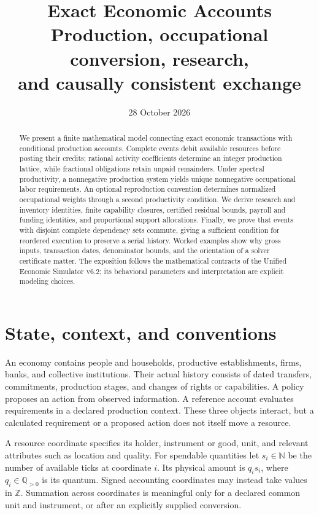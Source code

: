\documentclass[11pt,a4paper]{article}
\title{Exact Economic Accounts\\[4pt]\large Production, occupational conversion, research,\\and causally consistent exchange}
\author{}
\date{28 October 2026}
\begin{document}
\maketitle
\begin{abstract}
We present a finite mathematical model connecting exact economic transactions with conditional production accounts. Complete events debit available resources before posting their credits; rational activity coefficients determine an integer production lattice, while fractional obligations retain unpaid remainders. Under spectral productivity, a nonnegative production system yields unique nonnegative occupational labor requirements. An optional reproduction convention determines normalized occupational weights through a second productivity condition. We derive research and inventory identities, finite capability closures, certified residual bounds, payroll and funding identities, and proportional support allocations. Finally, we prove that events with disjoint complete dependency sets commute, giving a sufficient condition for reordered execution to preserve a serial history. Worked examples show why gross inputs, transaction dates, denominator bounds, and the orientation of a solver certificate matter. The exposition follows the mathematical contracts of the Unified Economic Simulator v6.2; its behavioral parameters and interpretation are explicit modeling choices.
\end{abstract}

\section{State, context, and conventions}
An economy contains people and households, productive establishments, firms, banks, and collective institutions. Their actual history consists of dated transfers, commitments, production stages, and changes of rights or capabilities. A policy proposes an action from observed information. A reference account evaluates requirements in a declared production context. These three objects interact, but a calculated requirement or a proposed action does not itself move a resource.

A resource coordinate specifies its holder, instrument or good, unit, and relevant attributes such as location and quality. For spendable quantities let $s_i\in\mathbb N$ be the number of available ticks at coordinate $i$. Its physical amount is $q_i s_i$, where $q_i\in\mathbb Q_{>0}$ is its quantum. Signed accounting coordinates may instead take values in $\mathbb Z$. Summation across coordinates is meaningful only for a declared common unit and instrument, or after an explicitly supplied conversion.
\end{document}
